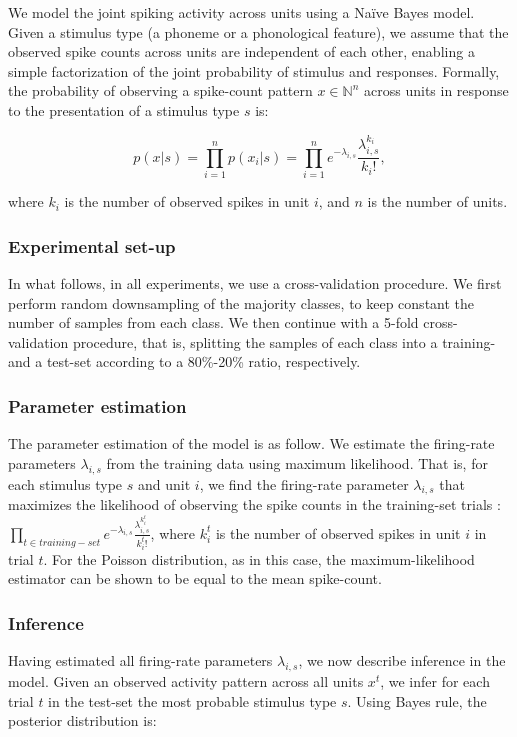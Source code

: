 We model the joint spiking activity across units using a Na\"{i}ve Bayes model. Given a stimulus type (a phoneme or a phonological feature), we assume that the observed spike counts across units are independent of each other, enabling a simple factorization of the joint probability of stimulus and responses. Formally, the probability of observing a spike-count pattern $x \in \mathbb{N}^n$ across units in response to the presentation of a stimulus type $s$ is:

\begin{equation}
    p(x|s)=\prod_{i=1}^n{p(x_i |s)}=\prod_{i=1}^n{e^{-\lambda_{i,s}}\frac{\lambda_{i,s}^{k_i}}{k_i!}},
\end{equation}

where $k_i$ is the number of observed spikes in unit $i$, and $n$ is the number of units. 

\subsubsection{Experimental set-up}
In what follows, in all experiments, we use a cross-validation procedure. We first perform random downsampling of the majority classes, to keep constant the number of samples from each class. We then continue with a 5-fold cross-validation procedure, that is, splitting the samples of each class into a training- and a test-set according to a 80\%-20\% ratio, respectively.

\subsubsection{Parameter estimation}
The parameter estimation of the model is as follow. We estimate the firing-rate parameters $\lambda_{i,s}$ from the training data using maximum likelihood. That is, for each stimulus type $s$ and unit $i$, we find the firing-rate parameter $\lambda_{i,s}$ that maximizes the likelihood of observing the spike counts in the training-set trials :$\prod_{t \in training-set}{e^{-\lambda_{i,s}}\frac{\lambda_{i,s}^{k^t_i}}{k^t_i!}}$, where $k^t_i$ is the number of observed spikes in unit $i$ in trial $t$. For the Poisson distribution, as in this case, the maximum-likelihood estimator can be shown to be equal to the mean spike-count.

\subsubsection{Inference}
Having estimated all firing-rate parameters $\lambda_{i,s}$, we now describe inference in the model. Given an observed activity pattern across all units $x^t$, we infer for each trial $t$ in the test-set the most probable stimulus type $s$. Using Bayes rule, the posterior distribution is: 

